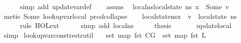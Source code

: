 \begin{isabellebody}
\ \ \ \ \isamarkupfalse%
\ {\isacharparenleft}{\kern0pt}simp\ add{\isacharcolon}{\kern0pt}\ update{\isacharunderscore}{\kern0pt}var{\isacharunderscore}{\kern0pt}def{\isacharparenright}{\kern0pt}\isanewline
\isanewline
\ \ \isamarkupfalse%
\ assms\ \isamarkupfalse%
\ local{\isacharunderscore}{\kern0pt}ns{\isacharcolon}{\kern0pt}{\isachardoublequoteopen}local{\isacharunderscore}{\kern0pt}state\ ns\ x\ {\isacharequal}{\kern0pt}\ Some\ v{\isachardoublequoteclose}\isanewline
\ \ \ \ \isamarkupfalse%
\ {\isacharparenleft}{\kern0pt}metis\ Some\ lookup{\isacharunderscore}{\kern0pt}var{\isacharunderscore}{\kern0pt}local\ prod{\isachardot}{\kern0pt}collapse{\isacharparenright}{\kern0pt}\isanewline
\isanewline
\ \ \isamarkupfalse%
\ {\isachardoublequoteopen}{\isacharparenleft}{\kern0pt}local{\isacharunderscore}{\kern0pt}state{\isacharparenleft}{\kern0pt}ns{\isacharparenright}{\kern0pt}{\isacharparenright}{\kern0pt}{\isacharparenleft}{\kern0pt}x\ {\isasymmapsto}\ v{\isacharparenright}{\kern0pt}\ {\isacharequal}{\kern0pt}\ local{\isacharunderscore}{\kern0pt}state\ ns{\isachardoublequoteclose}\isanewline
\ \ \ \ \isamarkupfalse%
\ {\isacharparenleft}{\kern0pt}rule\ HOL{\isachardot}{\kern0pt}ext{\isacharparenright}{\kern0pt}\isanewline
\ \ \ \ \isamarkupfalse%
\ {\isacharparenleft}{\kern0pt}simp\ add{\isacharcolon}{\kern0pt}\ local{\isacharunderscore}{\kern0pt}ns{\isacharparenright}{\kern0pt}\isanewline
\ \ \isamarkupfalse%
\ \isamarkupfalse%
\ {\isacharquery}{\kern0pt}thesis\ \isanewline
\ \ \ \ \isamarkupfalse%
\ update{\isacharunderscore}{\kern0pt}local\isanewline
\ \ \ \ \isamarkupfalse%
\ simp\isanewline
{}\isamarkupfalse%
%
\endisatagproof
{\isafoldproof}%
%
\isadelimproof
\isanewline
%
\endisadelimproof
\isanewline
{}\isamarkupfalse%
\ lookup{\isacharunderscore}{\kern0pt}var{\isacharunderscore}{\kern0pt}const{\isacharunderscore}{\kern0pt}restr{\isacharunderscore}{\kern0pt}util{\isacharunderscore}{\kern0pt}{}{\isacharcolon}{\kern0pt}\isanewline
\ \ \ {\isachardoublequoteopen}set\ {\isacharparenleft}{\kern0pt}map\ fst\ {\isacharparenleft}{\kern0pt}C{\isacharat}{\kern0pt}G{\isacharparenright}{\kern0pt}{\isacharparenright}{\kern0pt}\ {\isasyminter}\ set\ {\isacharparenleft}{\kern0pt}map\ fst\ L{\isacharparenright}{\kern0pt}\ {\isacharequal}{\kern0pt}\ {\isacharbraceleft}{\kern0pt}{\isacharbraceright}{\kern0pt}{\isachardoublequoteclose}\isanewline

\end{isabellebody}
